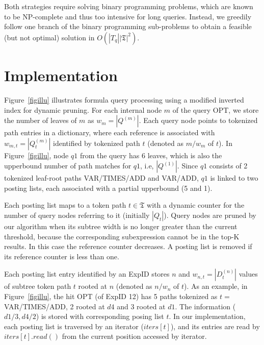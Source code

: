 \documentclass[runningheads]{llncs}
\begin{document}
Both strategies require solving binary programming problems, which are known to be NP-complete and thus too intensive for long queries.
Instead, we greedily follow one branch of the binary programming sub-problems to obtain a feasible (but not optimal) solution in $O(|T_q| |\mathfrak{T}|^2)$.

%

\section{Implementation}

Figure~\ref{figillu} illustrates formula query processing using a modified inverted index for dynamic pruning.
For each internal node $m$ of the query OPT, we store the number of leaves of $m$  as $w_m = |Q^{(m)}|$. 
Each query node points to tokenized path entries in a dictionary,
where each reference is associated with $w_{m,t} = |Q^{(m)}_t|$ identified by tokenized path $t$ (denoted as $m/w_m$ of $t$).
%
In Figure~\ref{figillu}, node $q1$ from the query has 6 leaves, which is also the upperbound number of path matches for $q1$, i.e, $|Q^{(1)}|$.
Since $q1$ consists of 2 tokenized leaf-root paths VAR/TIMES/ADD and VAR/ADD,
$q1$ is linked to two posting lists, each associated with a partial upperbound (5 and 1).

Each posting list maps to a token path $t \in \mathfrak{T}$ with a dynamic counter for the number of query nodes referring to it (initially $|Q_t|$).
Query nodes are pruned by our algorithm when its subtree width is no longer greater than the current threshold, because the corresponding subexpression cannot be in the top-K results. In this case
the reference counter decreases. A posting list is removed if its reference counter is less than one.

Each posting list entry identified by an ExpID stores $n$ and $w_{n,t} = |D^{(n)}_t|$ values of subtree token path $t$ rooted at $n$ (denoted as $n/w_n$ of $t$).
%
As an example, in Figure~\ref{figillu}, the hit OPT (of ExpID 12) has 5 paths tokenized as $t =$ VAR/TIMES/ADD, 2 rooted at $d4$ and 3 rooted at $d1$. The information ($d1/3, d4/2$) is stored with corresponding posing list $t$.
In our implementation, each posting list is traversed by an iterator ($iters[t]$), and its entries are read by $iters[t].read()$ from the current position accessed by iterator.
\end{document}
